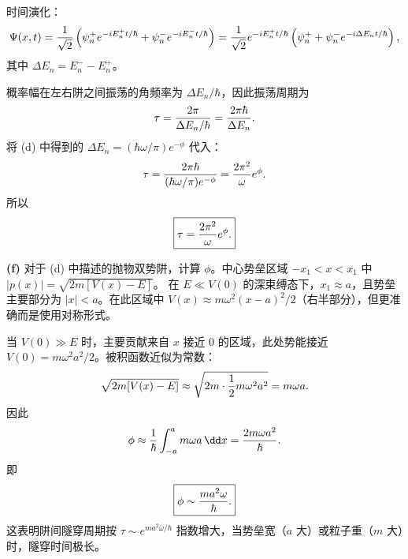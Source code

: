 \begin{solution}
时间演化：
\[
\Psi(x,t)={1\over\sqrt2}\left(
\psi_n^+ e^{-iE_n^+ t/\hbar}
+\psi_n^- e^{-iE_n^- t/\hbar}
\right)
={1\over\sqrt2}e^{-iE_n^+ t/\hbar}\left(
\psi_n^+ +\psi_n^- e^{-i\Delta E_n t/\hbar}
\right),
\]
其中 $\Delta E_n=E_n^--E_n^+$。

概率幅在左右阱之间振荡的角频率为 $\Delta E_n/\hbar$，因此振荡周期为
\[
\tau={2\pi\over\Delta E_n/\hbar}={2\pi\hbar\over\Delta E_n}.
\]
将 (d) 中得到的 $\Delta E_n=(\hbar\omega/\pi)e^{-\phi}$ 代入：
\[
\tau={2\pi\hbar\over(\hbar\omega/\pi)e^{-\phi}}
={2\pi^2\over\omega}e^\phi.
\]
所以
\[
\boxed{\tau={2\pi^2\over\omega}e^\phi.}
\]

\textbf{(f)} 对于 (d) 中描述的抛物双势阱，计算 $\phi$。中心势垒区域 $-x_1<x<x_1$ 中 $|p(x)|=\sqrt{2m[V(x)-E]}$。
在 $E\ll V(0)$ 的深束缚态下，$x_1\approx a$，且势垒主要部分为 $|x|<a$。在此区域中 $V(x)\approx m\omega^2(x-a)^2/2$（右半部分），但更准确而是使用对称形式。

当 $V(0)\gg E$ 时，主要贡献来自 $x$ 接近 $0$ 的区域，此处势能接近 $V(0)=m\omega^2a^2/2$。被积函数近似为常数：
\[
\sqrt{2m[V(x)-E]}\approx\sqrt{2m\cdot{1\over2}m\omega^2a^2}=m\omega a.
\]
因此
\[
\phi\approx{1\over\hbar}\int_{-a}^{a}m\omega a\,\dd x
={2m\omega a^2\over\hbar}.
\]
即
\[
\boxed{\phi\sim{ma^2\omega\over\hbar}.}
\]
这表明阱间隧穿周期按 $\tau\sim e^{ma^2\omega/\hbar}$ 指数增大，当势垒宽（$a$ 大）或粒子重（$m$ 大）时，隧穿时间极长。
\end{solution}


